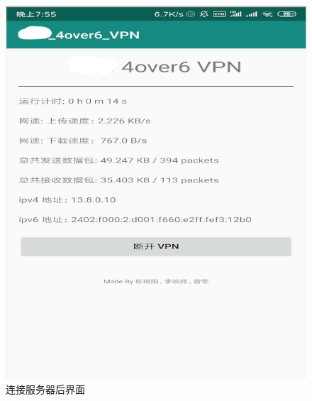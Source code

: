 \begin{figure}[!ht]
	\begin{center}
	\includegraphics[scale=.58]{connect2.png}
	\end{center}
	\caption{连接服务器后界面}
	\label{figure:连接服务器后界面}
\end{figure}


